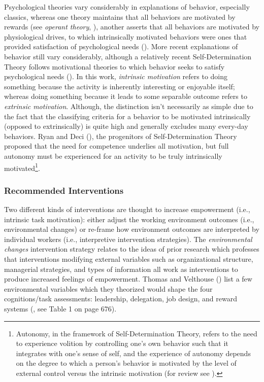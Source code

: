 \documentclass[
  11pt,
  a4paper,
]{article}
\begin{document}
Psychological theories vary considerably in explanations of behavior,
especially classics, whereas one theory maintains that all behaviors are
motivated by rewards (see \emph{operant theory},
), another asserts that all
behaviors are motivated by physiological drives, to which intrinsically
motivated behaviors were ones that provided satisfaction of
psychological needs (). More recent
explanations of behavior still vary considerably, although a relatively
recent Self-Determination Theory follows motivational theories to which
behavior seeks to satisfy psychological needs
(). In this work,
\emph{intrinsic motivation} refers to doing something because the
activity is inherently interesting or enjoyable itself; whereas doing
something because it leads to some separable outcome refers to
\emph{extrinsic motivation}. Although, the distinction isn't necessarily
as simple due to the fact that the classifying criteria for a behavior
to be motivated intrinsically (opposed to extrinsically) is quite high
and generally excludes many every-day behaviors. Ryan and Deci
(), the progenitors of Self-Determination
Theory proposed that the need for competence underlies all motivation,
but full autonomy must be experienced for an activity to be truly
intrinsically motivated\footnote{Autonomy, in the framework of
  Self-Determination Theory, refers to the need to experience volition
  by controlling one's own behavior such that it integrates with one's
  sense of self, and the experience of autonomy depends on the degree to
  which a person's behavior is motivated by the level of external
  control versus the intrinsic motivation (for review see
  ).}.

\subsubsection{Recommended
Interventions}\label{recommended-interventions-1}

Two different kinds of interventions are thought to increase empowerment
(i.e., intrinsic task motivation): either adjust the working environment
outcomes (i.e., environmental changes) or re-frame how environment
outcomes are interpreted by individual workers (i.e., interpretive
intervention strategies). The \emph{environmental changes} intervention
strategy relates to the ideas of prior research which professes that
interventions modifying external variables such as organizational
structure, managerial strategies, and types of information all work as
interventions to produce increased feelings of empowerment. Thomas and
Velthouse () list a few environmental
variables which they theorized would shape the four cognitions/task
assessments: leadership, delegation, job design, and reward systems
(, see Table 1 on
page 676).
\end{document}

